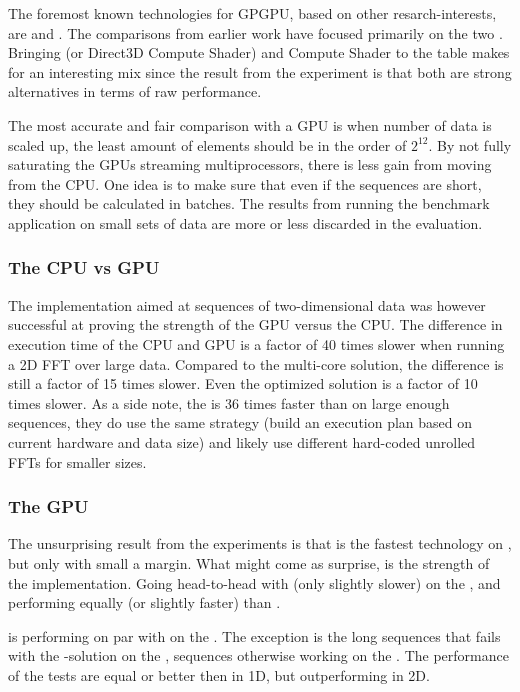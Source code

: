 The foremost known technologies for GPGPU, based on other resarch-interests, are {\CU} and {\OCL}. The comparisons from earlier work have focused primarily on the two \cite{fang2011comprehensive, park2011design, su2012overview}. Bringing {\DX} (or Direct3D Compute Shader) and {\GL} Compute Shader to the table makes for an interesting mix since the result from the experiment is that both are strong alternatives in terms of raw performance.

The most accurate and fair comparison with a GPU is when number of data is scaled up, the least amount of elements should be in the order of $2^{12}$. By not fully saturating the GPUs streaming multiprocessors, there is less gain from moving from the CPU. One idea is to make sure that even if the sequences are short, they should be calculated in batches. The results from running the benchmark application on small sets of data are more or less discarded in the evaluation.

\subsubsection{The CPU vs GPU}

The implementation aimed at sequences of two-dimensional data was however successful at proving the strength of the GPU versus the CPU. The difference in execution time of the CPU and GPU is a factor of 40 times slower when running a 2D FFT over large data. Compared to the multi-core {\OMP} solution, the difference is still a factor of 15 times slower. Even the optimized {\FFTW} solution is a factor of 10 times slower. As a side note, the {\CUFFT} is 36 times faster than {\FFTW} on large enough sequences, they do use the same strategy (build an execution plan based on current hardware and data size) and likely use different hard-coded unrolled FFTs for smaller sizes.

\subsubsection{The GPU}

The unsurprising result from the experiments is that {\CU} is the fastest technology on {\NVCARD}, but only with small a margin. What might come as surprise, is the strength of the {\DX} implementation. Going head-to-head with {\CU} (only slightly slower) on the {\NVCARD}, and performing equally (or slightly faster) than {\OCL}.

{\GL} is performing on par with {\DX} on the {\AMDCARD}. The exception is the long sequences that fails with the {\GL}-solution on the {\AMDCARD}, sequences otherwise working on the {\NVCARD}. The performance of the {\GL} tests are equal or better then {\OCL} in 1D, but outperforming {\OCL} in 2D.

